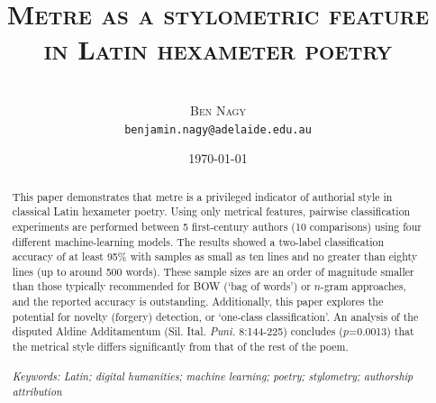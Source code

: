 \documentclass[11pt,a4paper]{scrartcl} %
\begin{document}
\title{\rmfamily\normalfont\textsc{Metre as a stylometric feature in Latin hexameter poetry}}
\author{\phantom{xxx}\\\textsc{Ben Nagy}\\\small{\texttt{benjamin.nagy@adelaide.edu.au}}}
\date{\normalsize{\today}}

\maketitle

\begin{abstract}
\noindent
This paper demonstrates that metre is a privileged indicator of authorial style in classical Latin hexameter poetry. Using only metrical features, pairwise classification experiments are performed between 5 first-century authors (10 comparisons) using four different machine-learning models. The results showed a two-label classification accuracy of at least 95\% with samples as small as ten lines and no greater than eighty lines (up to around 500 words). These sample sizes are an order of magnitude smaller than those typically recommended for BOW (`bag of words') or $n$-gram approaches, and the reported accuracy is outstanding. Additionally, this paper explores the potential for novelty (forgery) detection, or `one-class classification'. An analysis of the disputed Aldine Additamentum (Sil. Ital. \textit{Puni.} 8:144-225) concludes ($p$=0.0013) that the metrical style differs significantly from that of the rest of the poem.\\
\phantom{xxx}\\
\noindent\textit{Keywords: Latin; digital humanities; machine learning; poetry; stylometry; authorship attribution}
\end{abstract}
\end{document}
